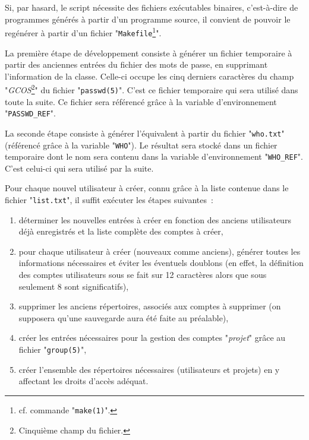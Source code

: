 Si, par hasard, le script n{\'e}cessite des fichiers ex{\'e}cutables binaires, c'est-{\`a}-dire
de programmes g{\'e}n{\'e}r{\'e}s {\`a} partir d'un programme source, il convient de pouvoir le
reg{\'e}n{\'e}rer {\`a} partir d'un fichier "{\tt Makefile}\footnote{cf. commande
"{\tt make(1)}".}".

La premi{\`e}re {\'e}tape de d{\'e}veloppement consiste {\`a} g{\'e}n{\'e}rer un fichier
temporaire {\`a} partir des anciennes entr{\'e}es du fichier des mots de passe,
en supprimant l'information de la classe. Celle-ci occupe les cinq
derniers caract{\`e}res du champ "{\sl GCOS}\footnote{Cinqui{\`e}me champ du
fichier.}" du fichier "{\tt passwd(5)}". C'est ce fichier
temporaire qui sera utilis{\'e} dans toute la suite. Ce fichier sera
r{\'e}f{\'e}renc{\'e} gr{\^a}ce {\`a} la variable d'environnement "{\tt PASSWD\_REF}".

La seconde {\'e}tape consiste {\`a} g{\'e}n{\'e}rer l'{\'e}quivalent {\`a} partir du fichier
"{\tt who.txt}" (r{\'e}f{\'e}renc{\'e} gr{\^a}ce {\`a} la variable "{\tt WHO}").
Le r{\'e}sultat sera stock{\'e} dans un fichier temporaire dont le nom
sera contenu dans la variable d'environnement "{\tt WHO\_REF}".
C'est celui-ci qui sera utilis{\'e} par la suite.

Pour chaque nouvel utilisateur {\`a} cr{\'e}er, connu gr{\^a}ce {\`a} la liste contenue
dans le fichier "{\tt list.txt}", il suffit ex{\'e}cuter les {\'e}tapes
suivantes~:
\begin{enumerate}
	\item	d{\'e}terminer les nouvelles entr{\'e}es {\`a} cr{\'e}er en fonction des anciens
			utilisateurs d{\'e}j{\`a} enregistr{\'e}s et la liste compl{\`e}te des comptes {\`a} cr{\'e}er,
	\item	pour chaque utilisateur {\`a} cr{\'e}er (nouveaux comme anciens), g{\'e}n{\'e}rer
			toutes les informations n{\'e}cessaires et {\'e}viter les {\'e}ventuels doublons (en
			effet, la d{\'e}finition des comptes utilisateurs sous {\OpenVMS} se
			fait sur 12 caract{\`e}res alors que sous {\Unix} seulement 8 sont
			significatifs),
	\item	supprimer les anciens r{\'e}pertoires, associ{\'e}s aux comptes {\`a} supprimer
			(on supposera qu'une sauvegarde aura {\'e}t{\'e} faite au pr{\'e}alable),
	\item	cr{\'e}er les entr{\'e}es n{\'e}cessaires pour la gestion des comptes
			"{\sl projet}" gr{\^a}ce au fichier "{\tt group(5)}",
	\item	cr{\'e}er l'ensemble des r{\'e}pertoires n{\'e}cessaires (utilisateurs et projets)
			en y affectant les droits d'acc{\`e}s ad{\'e}quat.
\end{enumerate}


